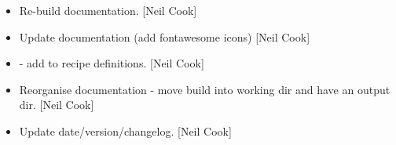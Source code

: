 \documentclass[a4paper,10pt,english]{report}
\begin{document}
\begin{itemize}
\item {} 
Re-build documentation. {[}Neil Cook{]}

\item {} 
Update documentation (add fontawesome icons) {[}Neil Cook{]}

\item {} 
 - add 
 to recipe definitions. {[}Neil Cook{]}

\item {} 
Reorganise documentation - move build into working dir and have an
output dir. {[}Neil Cook{]}

\item {} 
Update date/version/changelog. {[}Neil Cook{]}

\end{itemize}
\end{document}
